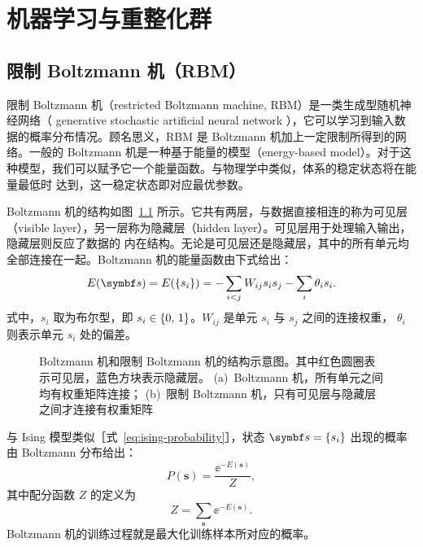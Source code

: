 \chapter{机器学习与重整化群}

\section{限制 Boltzmann 机（RBM）}

限制 Boltzmann 机（restricted Boltzmann machine, RBM）是一类生成型随机神经网络（ generative
stochastic artificial neural network ），它可以学习到输入数据的概率分布情况。顾名思义，RBM 是
Boltzmann 机加上一定限制所得到的网络。一般的 Boltzmann 机是一种基于能量的模型（energy-based
model）。对于这种模型，我们可以赋予它一个能量函数。与物理学中类似，体系的稳定状态将在能量最低时
达到，这一稳定状态即对应最优参数。

Boltzmann 机的结构如图~\ref{fig:boltzmann-machine} 所示。它共有两层，与数据直接相连的称为可见层
（visible layer），另一层称为隐藏层（hidden layer）。可见层用于处理输入输出，隐藏层则反应了数据的
内在结构。无论是可见层还是隐藏层，其中的所有单元均全部连接在一起。Boltzmann 机的能量函数由下式给出：
\begin{equation}
  E(\bm{s}) = E(\q{s_i}) = - \sum_{i<j} W_{ij} s_i s_j - \sum_i \theta_i s_i.
\end{equation}
式中，$s_i$ 取为布尔型，即 $s_i\in{\{0,\,1\}}$。$W_{ij}$ 是单元 $s_i$ 与 $s_j$ 之间的连接权重，
$\theta_i$ 则表示单元 $s_i$ 处的偏差。

\begin{figure}[htb]
  \centering
  \begin{subfigure}[b]{0.45\textwidth}
    \centering
    \caption{}
    \label{fig:boltzmann-machine}
  \end{subfigure}
  \begin{subfigure}[b]{0.45\textwidth}
    \centering
    \vspace{0.4cm}
    \caption{}
    \label{fig:rbm}
  \end{subfigure}
  \caption{Boltzmann 机和限制 Boltzmann 机的结构示意图。其中红色圆圈表示可见层，蓝色方块表示隐藏层。
    (a)~Boltzmann 机，所有单元之间均有权重矩阵连接；
    (b)~限制 Boltzmann 机，只有可见层与隐藏层之间才连接有权重矩阵}
\end{figure}

与 Ising 模型类似［式~\eqref{eq:ising-probability}］，状态 $\bm{s}=\q{s_i}$ 出现的概率由 Boltzmann
分布给出：
\begin{equation}
  \label{eq:boltzmann-machine-probability}
  P(\bm{s}) = \frac{\ee^{-E(\bm{s})}}{Z},
\end{equation}
其中配分函数 $Z$ 的定义为
\begin{equation}
  Z = \sum_{\bm{s}} \ee^{-E(\bm{s})}.
\end{equation}
Boltzmann 机的训练过程就是最大化训练样本所对应的概率。

